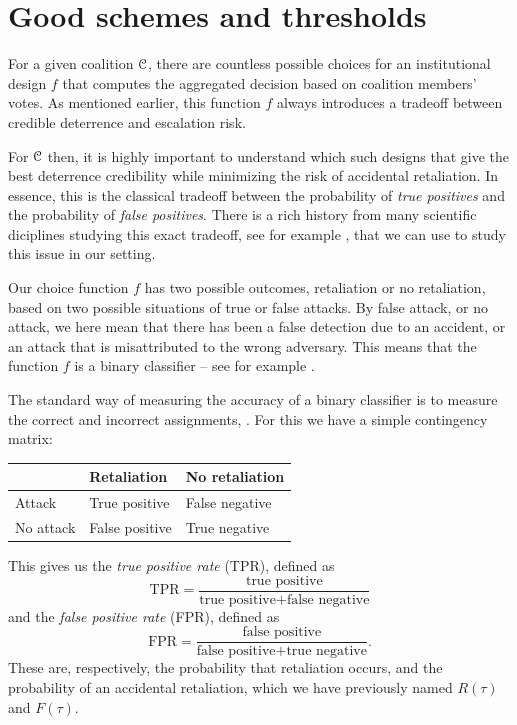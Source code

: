 
\section{Good schemes and thresholds}
For a given coalition $\EuScript{C}$, there are countless possible choices for an institutional design $f$ that computes the aggregated decision based on coalition members' votes. As mentioned earlier, this function $f$ always introduces a tradeoff between credible deterrence and escalation risk. 

For $\EuScript{C}$ then, it is highly important to understand which such designs that give the best deterrence credibility while minimizing the risk of accidental retaliation. In essence, this is the classical tradeoff between the probability of \emph{true positives} and the probability of \emph{false positives}. There is a rich history from many scientific diciplines studying this exact tradeoff, see for example \parencite{Green-Swets_1966}, that we can use to study this issue in our setting.

Our choice function $f$ has two possible outcomes, retaliation or no retaliation, based on two possible situations of true or false attacks. By false attack, or no attack, we here mean that there has been a false detection due to an accident, or an attack that is misattributed to the wrong adversary. This means that the function $f$ is a binary classifier -- see for example \parencite{Hastie-Tibshirani-Friedman_2009}. 

The standard way of measuring the accuracy of a binary classifier is to measure the correct and incorrect assignments, \parencite{Swets_1988}. For this we have a simple contingency matrix:

\begin{table}[h]
\centering
\begin{tabular}{l|ll}
    & Retaliation & No retaliation \\ \hline
    Attack & True positive & False negative       \\
    No attack & False positive & True negative
\end{tabular}
\end{table}

This gives us the \emph{true positive rate} (TPR), defined as 
\[\mathrm{TPR} = \frac{\text{true positive}}{\text{true positive} + \text{false negative}}\]
and the \emph{false positive rate} (FPR), defined as 
\[\mathrm{FPR} = \frac{\text{false positive}}{\text{false positive} + \text{true negative}}.\]
These are, respectively, the probability that retaliation occurs, and the probability of an accidental retaliation, which we have previously named $R(\tau)$ and $F(\tau)$. 

